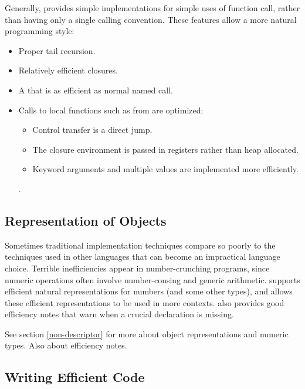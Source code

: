 Generally, \python{} provides simple implementations for simple uses
of function call, rather than having only a single calling convention.
These features allow a more natural programming style:

\begin{itemize} 
\item Proper tail recursion.  
  
\item Relatively efficient closures.
  
\item A  that is as efficient as normal named call.
  
\item Calls to local functions such as from  are
  optimized:
\begin{itemize}
  
\item Control transfer is a direct jump.
  
\item The closure environment is passed in registers rather than heap
  allocated.
  
\item Keyword arguments and multiple values are implemented more
  efficiently.
\end{itemize}

.
\end{itemize}


\subsection{Representation of Objects}

Sometimes traditional \llisp{} implementation techniques compare so
poorly to the techniques used in other languages that \llisp{} can
become an impractical language choice.  Terrible inefficiencies appear
in number-crunching programs, since \llisp{} numeric operations often
involve number-consing and generic arithmetic.  \python{} supports
efficient natural representations for numbers (and some other types),
and allows these efficient representations to be used in more
contexts.  \python{} also provides good efficiency notes that warn
when a crucial declaration is missing.

See section \ref{non-descriptor} for more about object representations and
numeric types.  Also  about efficiency notes.


\subsection{Writing Efficient Code}
\label{efficiency-overview}

